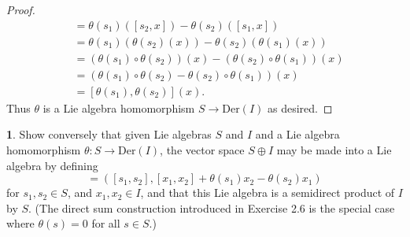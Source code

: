 \documentclass[12pt]{article}
\theoremstyle{definition}
\newtheorem{ex}{}
\begin{document}
\begin{proof}
\begin{align*}
		                      & = \theta(s_1)([s_2, x]) - \theta(s_2)([s_1, x])                       \\
		                      & = \theta(s_1)(\theta(s_2)(x)) - \theta(s_2)(\theta(s_1)(x))           \\
		                      & = (\theta(s_1)\circ\theta(s_2))(x) - (\theta(s_2)\circ\theta(s_1))(x) \\
		                      & = (\theta(s_1)\circ\theta(s_2) - \theta(s_2)\circ\theta(s_1))(x)      \\
		                      & = [\theta(s_1), \theta(s_2)](x).
	\end{align*}
	Thus $\theta$ is a Lie algebra homomorphism $S \to \mathrm{Der}(I)$ as desired.
\end{proof}

\begin{ex}
	Show conversely that given Lie algebras $S$ and $I$ and a Lie algebra homomorphism $\theta : S \to \mathrm{Der}(I)$, the vector space $S \oplus I$ may be made into a Lie algebra by defining \begin{equation*}
		[(s_1, x_1), (s_2, x_2)] = ([s_1, s_2], [x_1, x_2] + \theta(s_1)x_2 - \theta(s_2)x_1)
	\end{equation*}
	for $s_1, s_2 \in S$, and $x_1, x_2 \in I$, and that this Lie algebra is a semidirect product of $I$ by $S$.
	(The direct sum construction introduced in Exercise 2.6 is the special case where $\theta(s) = 0$ for all $s \in S$.)
\end{ex}
\end{document}
